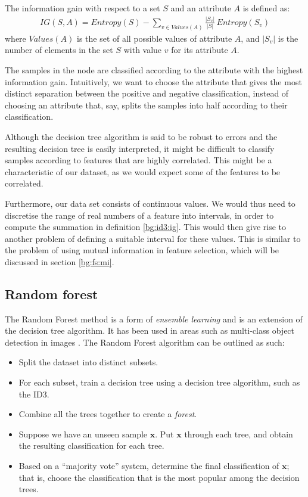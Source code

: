 \documentclass[12pt, twoside, a4paper]{report}
\begin{document}
\begin{mydef}
The information gain with respect to a set $S$ and an attribute $A$ is defined as:
\begin{align*}
IG(S, A) = Entropy(S) - \sum_{v \in Values(A)} \frac{|S_v|}{|S|} \, Entropy(S_v)
\end{align*}
where $Values(A)$ is the set of all possible values of attribute $A$, and $|S_v|$ is the number of elements in the set $S$ with value $v$ for its attribute $A$.
\label{bg:id3:ig}
\end{mydef}

The samples in the node are classified according to the attribute with the highest information gain. Intuitively, we want to choose the attribute that gives the most distinct separation between the positive and negative classification, instead of choosing an attribute that, say, splits the samples into half according to their classification.

Although the decision tree algorithm is said to be robust to errors \cite{RefWorks:98} and the resulting decision tree is easily interpreted, it might be difficult to classify samples according to features that are highly correlated. This might be a characteristic of our dataset, as we would expect some of the features to be correlated.

Furthermore, our data set consists of continuous values. We would thus need to discretise the range of real numbers of a feature into intervals, in order to compute the summation in definition \ref{bg:id3:ig}. This would then give rise to another problem of defining a suitable interval for these values. This is similar to the problem of using mutual information in feature selection, which will be discussed in section \ref{bg:fs:mi}.

\subsection{Random forest}
The Random Forest method \cite{RefWorks:101} is a form of \textit{ensemble learning} and is an extension of the decision tree algorithm. It has been used in areas such as multi-class object detection in images \cite{RefWorks:100}. The Random Forest algorithm can be outlined as such:
\begin{itemize}
\item Split the dataset into distinct subsets.
\item For each subset, train a decision tree using a decision tree algorithm, such as the ID3.
\item Combine all the trees together to create a \textit{forest}.
\item Suppose we have an unseen sample $\boldsymbol x$.  Put $\boldsymbol x$ through each tree, and obtain the resulting classification for each tree.
\item Based on a ``majority vote'' system, determine the final classification of $\boldsymbol x$; that is, choose the classification that is the most popular among the decision trees.
\end{itemize}
\end{document}
